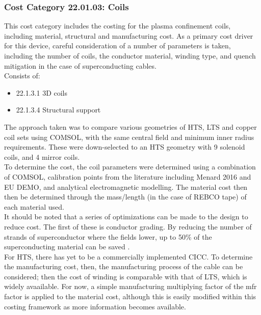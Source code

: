 \subsubsection*{Cost Category 22.01.03: Coils}

This cost category includes the costing for the plasma confinement coils, including  material, structural and manufacturing cost. As a primary cost driver for this device, careful consideration of a number of parameters is taken, including the number of coils, the conductor material, winding type, and quench mitigation in the case of superconducting cables.\\

Consists of:

\begin{itemize}
    \item 22.1.3.1 3D coils
    \item 22.1.3.4 Structural support
\end{itemize}
   

The approach taken was to compare various geometries of HTS, LTS and copper coil sets using COMSOL, with the same central field and minimum inner radius requirements. These were down-selected to an HTS geometry with 9 solenoid coils, and 4 mirror coils.\\

To determine the cost, the coil parameters were determined using a combination of COMSOL, calibration points from the literature including Menard 2016 \cite{Menard2016} and EU DEMO, and analytical electromagnetic modelling. The material cost then then be determined through the mass/length (in the case of REBCO tape) of each material used.\\

It should be noted that a series of optimizations can be made to the design to reduce cost. The first of these is conductor grading. By reducing the number of strands of superconductor where the fields lower, up to 50\% of the superconducting material can be saved \cite{uglietti2018progressing}.\\

For HTS, there has yet to be a commercially implemented CICC. To determine the manufacturing cost, then, the manufacturing process of the cable can be considered; then the cost of winding is comparable with that of LTS, which is widely avaailable. For now, a simple manufacturing multiplying factor of the mfr factor is applied to the material cost, although this is easily modified within this costing framework as more information becomes available.\\

